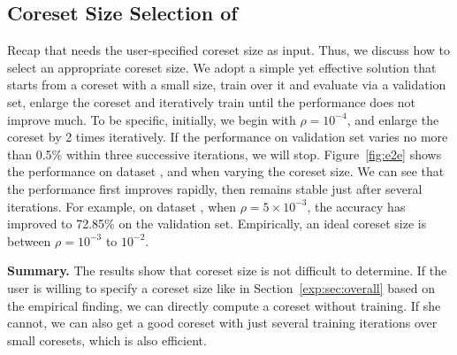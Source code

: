 \vspace{-0.5em}
\subsection{Coreset Size Selection of \ours}
\label{exp:sec:end2end}



Recap that \ours needs the user-specified coreset size as input. Thus, we discuss how to select an appropriate coreset size. We adopt a simple yet effective solution that starts from a coreset with a small size, train over it and
evaluate via a validation set, enlarge the coreset and iteratively
train  until the performance does not improve much. 
To be specific, initially, we begin with $\rho = 10^{-4}$, and   enlarge the coreset by 2 times iteratively. If the performance on validation set varies no more than 0.5\% within three
successive iterations, we will
stop.
 Figure~\ref{fig:e2e} shows the performance on dataset \hr, \adult and \bike when varying the coreset size. We can see that the performance first improves rapidly, then remains  stable just after several iterations. For example, on dataset \adult, when $\rho=5\times 10^{-3}$, the accuracy has improved  to 72.85\% on the validation set. Empirically, an ideal coreset size is between $\rho=10^{-3}$ to $10^{-2}$.
 
\noindent \textbf{Summary.} The results show that coreset size is not difficult to determine. If the user is willing to specify a coreset size like in Section~\ref{exp:sec:overall} based on the empirical finding, we can directly compute a coreset without training. If she cannot, we can also get a good coreset with just several training iterations over small coresets, which is also efficient.
 
 


